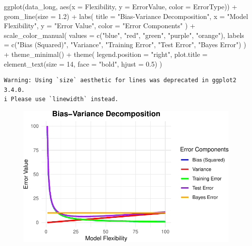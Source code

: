 \documentclass[
]{article}
\newenvironment{Shaded}{\begin{snugshade}}{\end{snugshade}}
\newcommand{\AttributeTok}[1]{\textcolor[rgb]{0.40,0.45,0.13}{#1}}
\newcommand{\DecValTok}[1]{\textcolor[rgb]{0.68,0.00,0.00}{#1}}
\newcommand{\FloatTok}[1]{\textcolor[rgb]{0.68,0.00,0.00}{#1}}
\newcommand{\FunctionTok}[1]{\textcolor[rgb]{0.28,0.35,0.67}{#1}}
\newcommand{\NormalTok}[1]{\textcolor[rgb]{0.00,0.23,0.31}{#1}}
\newcommand{\SpecialCharTok}[1]{\textcolor[rgb]{0.37,0.37,0.37}{#1}}
\newcommand{\StringTok}[1]{\textcolor[rgb]{0.13,0.47,0.30}{#1}}
\begin{document}
\begin{Shaded}
\begin{Highlighting}[]
\FunctionTok{ggplot}\NormalTok{(data\_long, }\FunctionTok{aes}\NormalTok{(}\AttributeTok{x =}\NormalTok{ Flexibility, }\AttributeTok{y =}\NormalTok{ ErrorValue, }\AttributeTok{color =}\NormalTok{ ErrorType)) }\SpecialCharTok{+}
  \FunctionTok{geom\_line}\NormalTok{(}\AttributeTok{size =} \FloatTok{1.2}\NormalTok{) }\SpecialCharTok{+}
  \FunctionTok{labs}\NormalTok{(}
    \AttributeTok{title =} \StringTok{"Bias{-}Variance Decomposition"}\NormalTok{,}
    \AttributeTok{x =} \StringTok{"Model Flexibility"}\NormalTok{,}
    \AttributeTok{y =} \StringTok{"Error Value"}\NormalTok{,}
    \AttributeTok{color =} \StringTok{"Error Components"}
\NormalTok{  ) }\SpecialCharTok{+}
  \FunctionTok{scale\_color\_manual}\NormalTok{(}
    \AttributeTok{values =} \FunctionTok{c}\NormalTok{(}\StringTok{"blue"}\NormalTok{, }\StringTok{"red"}\NormalTok{, }\StringTok{"green"}\NormalTok{, }\StringTok{"purple"}\NormalTok{, }\StringTok{"orange"}\NormalTok{),}
    \AttributeTok{labels =} \FunctionTok{c}\NormalTok{(}\StringTok{"Bias (Squared)"}\NormalTok{, }\StringTok{"Variance"}\NormalTok{, }\StringTok{"Training Error"}\NormalTok{, }\StringTok{"Test Error"}\NormalTok{, }\StringTok{"Bayes Error"}\NormalTok{)}
\NormalTok{  ) }\SpecialCharTok{+}
  \FunctionTok{theme\_minimal}\NormalTok{() }\SpecialCharTok{+}
  \FunctionTok{theme}\NormalTok{(}
    \AttributeTok{legend.position =} \StringTok{"right"}\NormalTok{,}
    \AttributeTok{plot.title =} \FunctionTok{element\_text}\NormalTok{(}\AttributeTok{size =} \DecValTok{14}\NormalTok{, }\AttributeTok{face =} \StringTok{"bold"}\NormalTok{, }\AttributeTok{hjust =} \FloatTok{0.5}\NormalTok{)}
\NormalTok{  )}
\end{Highlighting}
\end{Shaded}

\begin{verbatim}
Warning: Using `size` aesthetic for lines was deprecated in ggplot2 3.4.0.
i Please use `linewidth` instead.
\end{verbatim}

\begin{figure}[H]

{\centering \includegraphics{hw1_files/figure-pdf/unnamed-chunk-2-1.pdf}

}

\end{figure}
\end{document}
